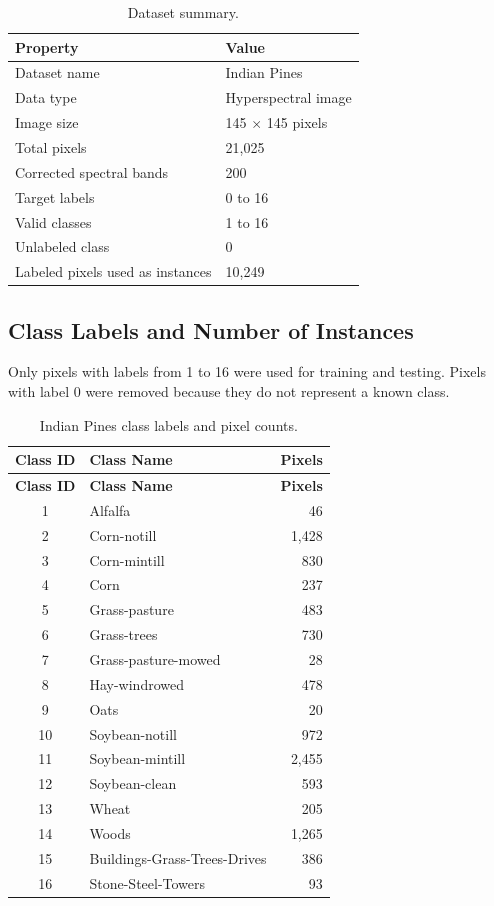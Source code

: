\documentclass[12pt,a4paper]{article}
\begin{document}
\begin{table}[H]
\centering
\begin{tabular}{ll}
\toprule
\textbf{Property} & \textbf{Value} \\
\midrule
Dataset name & Indian Pines \\
Data type & Hyperspectral image \\
Image size & 145 $\times$ 145 pixels \\
Total pixels & 21,025 \\
Corrected spectral bands & 200 \\
Target labels & 0 to 16 \\
Valid classes & 1 to 16 \\
Unlabeled class & 0 \\
Labeled pixels used as instances & 10,249 \\

\bottomrule
\end{tabular}
\caption{Dataset summary.}
\end{table}

\subsection{Class Labels and Number of Instances}

Only pixels with labels from 1 to 16 were used for training and testing. Pixels with label 0 were removed because they do not represent a known class.

\begin{longtable}{clr}
\caption{Indian Pines class labels and pixel counts.}\\
\toprule
\textbf{Class ID} & \textbf{Class Name} & \textbf{Pixels} \\
\midrule
\endfirsthead
\toprule
\textbf{Class ID} & \textbf{Class Name} & \textbf{Pixels} \\
\midrule
\endhead
1 & Alfalfa & 46 \\
2 & Corn-notill & 1,428 \\
3 & Corn-mintill & 830 \\
4 & Corn & 237 \\
5 & Grass-pasture & 483 \\
6 & Grass-trees & 730 \\
7 & Grass-pasture-mowed & 28 \\
8 & Hay-windrowed & 478 \\
9 & Oats & 20 \\
10 & Soybean-notill & 972 \\
11 & Soybean-mintill & 2,455 \\
12 & Soybean-clean & 593 \\
13 & Wheat & 205 \\
14 & Woods & 1,265 \\
15 & Buildings-Grass-Trees-Drives & 386 \\
16 & Stone-Steel-Towers & 93 \\
\bottomrule
\end{longtable}
\end{document}
